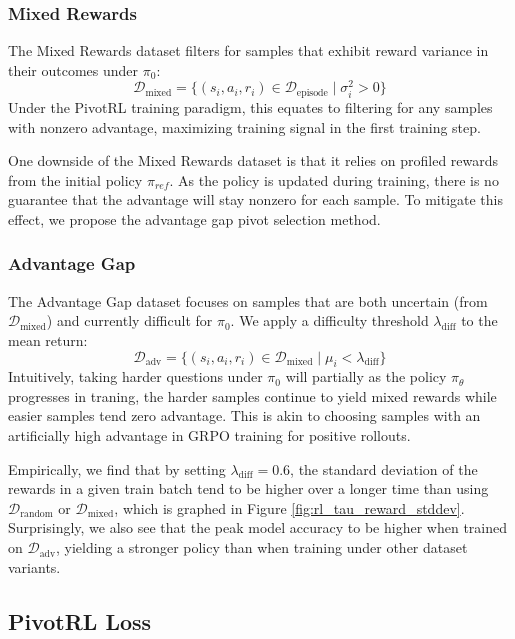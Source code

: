 \subsubsection{Mixed Rewards}
The Mixed Rewards dataset filters for samples that exhibit reward variance in their outcomes under $\pi_0$:
\begin{equation}
    \mathcal{D}_{\text{mixed}} = \{ (s_i, a_i, r_i) \in \mathcal{D}_{\text{episode}} \mid \sigma^2_i > 0 \}
\end{equation}
Under the PivotRL training paradigm, this equates to filtering for any samples with nonzero advantage, maximizing training signal in the first training step.

One downside of the Mixed Rewards dataset is that it relies on profiled rewards from the initial policy $\pi_{ref}$. As the policy is updated during training, there is no guarantee that the advantage will stay nonzero for each sample. To mitigate this effect, we propose the advantage gap pivot selection method.

\subsubsection{Advantage Gap}
The Advantage Gap dataset focuses on samples that are both uncertain (from $\mathcal{D}_{\text{mixed}}$) and currently difficult for $\pi_0$. We apply a difficulty threshold $\lambda_{\text{diff}}$ to the mean return:
\begin{equation}
    \mathcal{D}_{\text{adv}} = \{ (s_i, a_i, r_i) \in \mathcal{D}_{\text{mixed}} \mid \mu_i < \lambda_{\text{diff}} \}
\end{equation}
Intuitively, taking harder questions under $\pi_0$ will partially as the policy $\pi_\theta$ progresses in traning, the harder samples continue to yield mixed rewards while easier samples tend zero advantage. This is akin to choosing samples with an artificially high advantage in GRPO training for positive rollouts.

Empirically, we find that by setting $\lambda_{\text{diff}} = 0.6$, the standard deviation of the rewards in a given train batch tend to be higher over a longer time than using $\mathcal{D}_{\text{random}}$ or $\mathcal{D}_{\text{mixed}}$, which is graphed in Figure \ref{fig:rl_tau_reward_stddev}. Surprisingly, we also see that the peak model accuracy to be higher when trained on $\mathcal{D}_{\text{adv}}$, yielding a stronger policy than when training under other dataset variants.

\subsection{PivotRL Loss}

